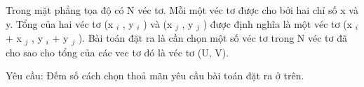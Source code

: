 Trong mặt phẳng tọa độ có N véc tơ. Mỗi một véc tơ được cho bởi hai chỉ số x và y. Tổng của hai véc tơ (x   $_    i   $   , y   $_    i   $   ) và (x   $_    j   $   , y   $_    j   $   ) được định nghĩa là một véc tơ (x   $_    i   $   + x   $_    j   $   , y   $_    i   $   + y   $_    j   $   ). Bài toán đặt ra là cần chọn một số véc tơ trong N véc tơ đã cho sao cho tổng của các vec tơ đó là véc tơ (U, V).  

   Yêu cầu: Đếm số cách chọn thoả mãn yêu cầu bài toán đặt ra ở trên.
